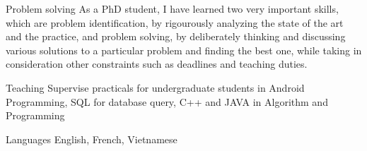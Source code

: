 \begin{cvskills}
\vspace{0.1cm}
\cvskill
{Problem solving} %
{As a PhD student, I have learned two very important skills, which are problem identification, by rigourously analyzing the state of the art and the practice, and problem solving, by deliberately thinking and discussing various solutions to a particular problem and finding the best one, while taking in consideration other constraints such as deadlines and teaching duties.} %

\vspace{0.1cm}
\cvskill
{Teaching}
{Supervise practicals for undergraduate students in Android Programming, SQL for database query, C++ and JAVA in Algorithm and Programming}

\vspace{0.1cm}
\cvskill
{Languages} %
{English, French, Vietnamese} %






\end{cvskills}